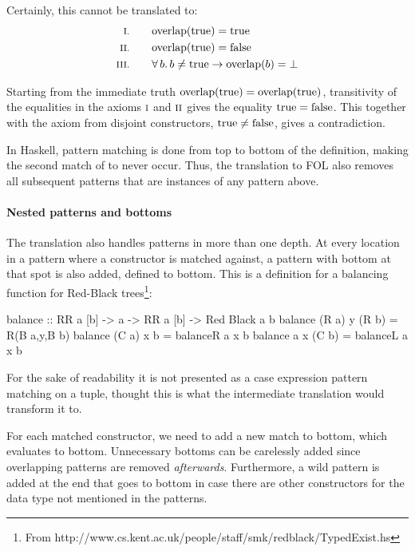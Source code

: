 Certainly, this cannot be translated to:
\begin{align*}
\rom{1} \qquad & \fn{overlap}(\fn{true}) = \fn{true} \\
\rom{2} \qquad & \fn{overlap}(\fn{true}) = \fn{false} \\
\rom{3} \qquad & \fa{b} b \neq \fn{true} \rightarrow \fn{overlap}(b) = \bot
\end{align*}

Starting from the immediate truth $\mathrm{overlap}(\mathrm{true}) =
\mathrm{overlap}(\mathrm{true})$, transitivity of the equalities in the axioms
$\romnodot{1}$ and $\romnodot{2}$ gives the equality $\mathrm{true} =
\mathrm{false}$. This together with the axiom from disjoint constructors,
$\mathrm{true} \neq \mathrm{false}$, gives a contradiction.

In Haskell, pattern matching is done from top to bottom of the
definition, making the second match of  to never occur. Thus,
the translation to FOL also removes all subsequent patterns that are
instances of any pattern above.

\paragraph{Nested patterns and bottoms} The translation also handles
patterns in more than one depth. At every location in a pattern where
a constructor is matched against, a pattern with bottom at that spot
is also added, defined to bottom. This is a definition for a balancing
function for Red-Black trees\footnote{From
  http://www.cs.kent.ac.uk/people/staff/smk/redblack/TypedExist.hs}:

\begin{code}
balance :: RR a [b] -> a -> RR a [b] -> Red Black a b
balance (R a) y (R b) = R(B a,y,B b)
balance (C a) x b     = balanceR a x b
balance a     x (C b) = balanceL a x b
\end{code}

\noindent
For the sake of readability it is not presented as a case expression
pattern matching on a tuple, thought this is what the intermediate
translation would transform it to.

For each matched constructor, we need to add a new match to bottom,
which evaluates to bottom. Unnecessary bottoms can be carelessly added
since overlapping patterns are removed \emph{afterwards}. Furthermore,
a wild pattern is added at the end that goes to bottom in case there
are other constructors for the data type not mentioned in the
patterns.

